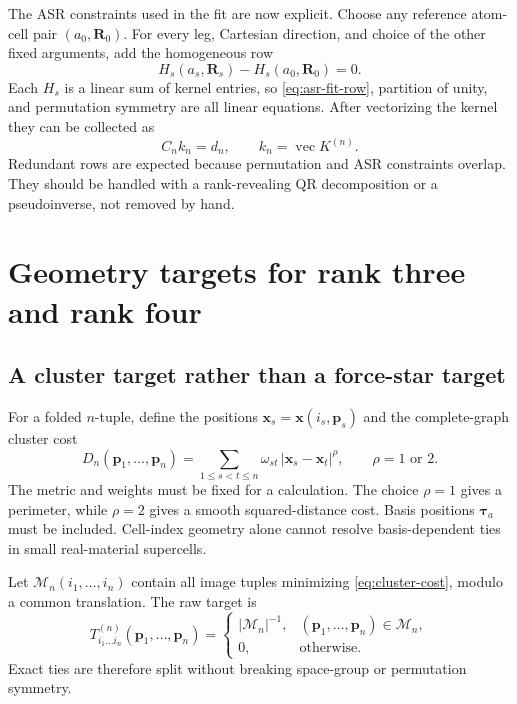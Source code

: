 \documentclass{article}
\begin{document}
The ASR constraints used in the fit are now explicit. Choose any reference
atom-cell pair $(a_0,\bm R_0)$. For every leg, Cartesian direction, and
choice of the other fixed arguments, add the homogeneous row
\begin{equation}
    H_s(a_s,\bm R_s)-H_s(a_0,\bm R_0)=0.
    \label{eq:asr-fit-row}
\end{equation}
Each $H_s$ is a linear sum of kernel entries, so
\autoref{eq:asr-fit-row}, partition of unity, and permutation symmetry are
all linear equations. After vectorizing the kernel they can be collected as
\begin{equation}
    C_n k_n=d_n,
    \qquad k_n=\operatorname{vec}K^{(n)}.
    \label{eq:linear-constraints}
\end{equation}
Redundant rows are expected because permutation and ASR constraints
overlap. They should be handled with a rank-revealing QR decomposition or
a pseudoinverse, not removed by hand.

\section{Geometry targets for rank three and rank four}
\label{sec:high-rank}

\subsection{A cluster target rather than a force-star target}
\label{sec:cluster-target}

For a folded $n$-tuple, define the positions
$\bm x_s=\bm x(i_s,\bm p_s)$ and the complete-graph cluster cost
\begin{equation}
    D_n(\bm p_1,\ldots,\bm p_n)
    =
    \sum_{1\leq s<t\leq n}
    \omega_{st}\,
    \left|\bm x_s-\bm x_t\right|^\rho ,
    \qquad \rho=1\text{ or }2.
    \label{eq:cluster-cost}
\end{equation}
The metric and weights must be fixed for a calculation. The choice
$\rho=1$ gives a perimeter, while $\rho=2$ gives a smooth squared-distance
cost. Basis positions $\bm\tau_a$ must be included. Cell-index geometry
alone cannot resolve basis-dependent ties in small real-material
supercells.

Let $\mathcal M_n(i_1,\ldots,i_n)$ contain all image tuples minimizing
\autoref{eq:cluster-cost}, modulo a common translation. The raw target is
\begin{equation}
    T^{(n)}_{i_1\ldots i_n}
    (\bm p_1,\ldots,\bm p_n)
    =
    \begin{cases}
    |\mathcal M_n|^{-1},
    &(\bm p_1,\ldots,\bm p_n)\in\mathcal M_n,\\
    0,&\text{otherwise}.
    \end{cases}
    \label{eq:raw-target}
\end{equation}
Exact ties are therefore split without breaking space-group or permutation
symmetry.
\end{document}

